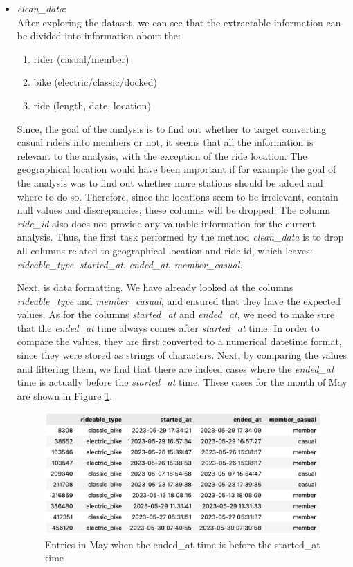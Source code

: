 \documentclass[12pt]{article}
\begin{document}
\begin{itemize}
	\item \textit{clean\_data}:\\
	After exploring the dataset, we can see that the extractable information can be divided into information about the:
	\begin{enumerate} 
	\item rider (casual/member)
	\item bike (electric/classic/docked)
	\item ride (length, date, location)
	\end{enumerate}
Since, the goal of the analysis is to find out whether to target converting casual riders into members or not, it seems that all the information is relevant to the analysis, with the exception of the ride location. The geographical location would have been important if for example the goal of the analysis was to find out whether more stations should be added and where to do so. Therefore, since the locations seem to be irrelevant, contain null values and discrepancies, these columns will be dropped. The column \textit{ride\_id} also does not provide any valuable information for the current analysis. Thus, the first task performed by the method \textit{clean\_data} is to drop all columns related to geographical location and ride id, which leaves: \textit{rideable\_type}, \textit{started\_at}, \textit{ended\_at}, \textit{member\_casual}. 


Next, is data formatting. We have already looked at the columns \textit{rideable\_type} and \textit{member\_casual}, and ensured that they have the expected values. As for the columns \textit{started\_at} and \textit{ended\_at}, we need to make sure that the \textit{ended\_at} time always comes after \textit{started\_at} time. In order to compare the values, they are first converted to a numerical datetime format, since they were stored as strings of characters. Next, by comparing the values and filtering them, we find that there are indeed cases where the \textit{ended\_at} time is actually before the \textit{started\_at} time. These cases for the month of May are shown in Figure \ref{fig8}.

	\begin{figure}[h]
	\centering
	\includegraphics[scale=0.56]{imgNEG.png}
	\caption{Entries in May when the ended\_at time is before the started\_at time}
	\label{fig8}
	\end{figure}


\end{itemize}
\end{document}
